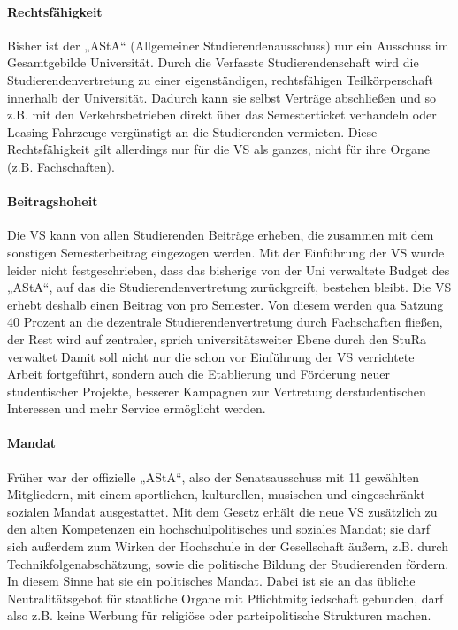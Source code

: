 \paragraph{Rechtsfähigkeit}

Bisher ist der „AStA“ (Allgemeiner Studierendenausschuss) nur ein Ausschuss
im Gesamtgebilde Universität. Durch die Verfasste Studierendenschaft wird
die Studierendenvertretung zu einer eigenständigen, rechtsfähigen Teilkörperschaft
innerhalb der Universität. Dadurch kann sie selbst Verträge abschließen und
so z.B. mit den Verkehrsbetrieben direkt über das Semesterticket verhandeln
oder Leasing-Fahrzeuge vergünstigt an die Studierenden vermieten.
Diese Rechtsfähigkeit gilt allerdings nur für die VS als ganzes,
nicht für ihre Organe (z.B. Fachschaften).

\paragraph{Beitragshoheit}

Die VS kann von allen Studierenden Beiträge erheben, die zusammen mit dem
sonstigen Semesterbeitrag eingezogen werden. Mit der Einführung der VS
wurde leider nicht festgeschrieben, dass das bisherige von der Uni verwaltete
Budget des „AStA“, auf das die Studierendenvertretung zurückgreift,
bestehen bleibt. Die VS erhebt deshalb einen Beitrag von  pro 
Semester. Von diesem werden qua Satzung 40 Prozent an die dezentrale 
Studierendenvertretung durch Fachschaften fließen, der Rest wird auf zentraler, 
sprich universitätsweiter Ebene durch den StuRa verwaltet Damit soll nicht 
nur die schon vor Einführung der VS verrichtete Arbeit fortgeführt, sondern 
auch die Etablierung und Förderung neuer studentischer Projekte, besserer 
Kampagnen zur Vertretung derstudentischen Interessen und mehr Service ermöglicht 
werden.

\paragraph{Mandat}

Früher war der offizielle „AStA“, also der Senatsausschuss mit 11 gewählten
Mitgliedern, mit einem sportlichen, kulturellen, musischen und eingeschränkt
sozialen Mandat ausgestattet.
Mit dem Gesetz erhält die neue VS zusätzlich zu den alten Kompetenzen ein
hochschulpolitisches und soziales Mandat; sie darf sich außerdem zum Wirken
der Hochschule in der Gesellschaft äußern, z.B. durch Technikfolgenabschätzung,
sowie die politische Bildung der Studierenden fördern. In diesem Sinne hat
sie ein politisches Mandat. Dabei ist sie an das übliche Neutralitätsgebot
für staatliche Organe mit Pflichtmitgliedschaft gebunden, darf also z.B.
keine Werbung für religiöse oder parteipolitische Strukturen machen.

